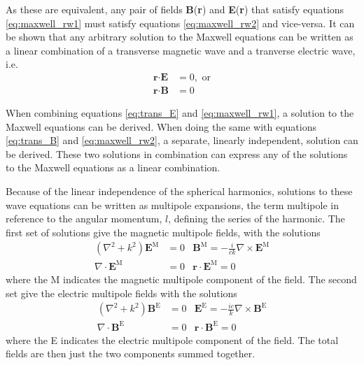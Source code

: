 As these are equivalent, any pair of fields \textbf{B}(\textbf{r}) and \textbf{E}(\textbf{r}) that satisfy equations \ref{eq:maxwell_rw1} must satisfy equations \ref{eq:maxwell_rw2} and vice-versa. It can be shown that any arbitrary solution to the Maxwell equations can be written as a linear combination of a transverse magnetic wave and a tranverse electric wave, i.e. 
\begin{align}
    \label{eq:trans_E}
    \textbf{r} \cdot \textbf{E} & = 0, \text{ or} \\
    \label{eq:trans_B}
    \textbf{r} \cdot \textbf{B} & = 0
\end{align}

When combining equations \ref{eq:trans_E} and \ref{eq:maxwell_rw1}, a solution to the Maxwell equations can be derived. When doing the same with equations \ref{eq:trans_B} and \ref{eq:maxwell_rw2}, a separate, linearly independent, solution can be derived. These two solutions in combination can express any of the solutions to the Maxwell equations as a linear combination.

Because of the linear independence of the spherical harmonics, solutions to these wave equations can be written as multipole expansions, the term multipole in reference to the angular momentum, $l$, defining the series of the harmonic. The first set of solutions give the magnetic multipole fields, with the solutions
\begin{subequations}
\label{eq:magnetic_sol}
\begin{align}
    \left(\nabla^2+k^2\right)\textbf{E}^\text{M} & = 0 & \textbf{B}^\text{M}=-\frac{i}{ck} \nabla \times \textbf{E}^\text{M} \\
    \nabla \cdot \textbf{E}^\text{M} & = 0 & \textbf{r}\cdot\textbf{E}^\text{M}=0
\end{align}
\end{subequations}
where the M indicates the magnetic multipole component of the field. The second set give the electric multipole fields with the solutions
\begin{subequations}
\label{eq:electric_sol}
\begin{align}
    \left(\nabla^2+k^2\right)\textbf{B}^\text{E} & = 0 & \textbf{E}^\text{E}=-\frac{ic}{k} \nabla \times \textbf{B}^\text{E} \\
    \nabla \cdot \textbf{B}^\text{E} & = 0 & \textbf{r}\cdot\textbf{B}^\text{E}=0
\end{align}
\end{subequations}
where the E indicates the electric multipole component of the field. The total fields are then just the two components summed together.

